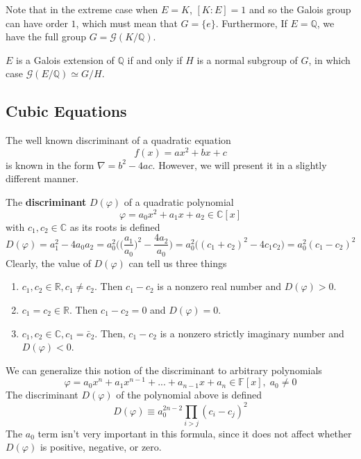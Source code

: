   Note that in the extreme case when $E = K$, $[K:E] = 1$ and so the Galois group can have order $1$, which must mean that $G = \{e\}$. Furthermore, If $E = \mathbb{Q}$, we have the full group $G = \mathcal{G}(K/\mathbb{Q})$. 

  \begin{corollary}
    $E$ is a Galois extension of $\mathbb{Q}$ if and only if $H$ is a normal subgroup of $G$, in which case $\mathcal{G}(E/\mathbb{Q}) \simeq G/H$. 
  \end{corollary}

\subsection{Cubic Equations}

  The well known discriminant of a quadratic equation 
  \begin{equation}
    f(x) = ax^2 + bx + c
  \end{equation}
  is known in the form $\nabla = b^2 - 4ac$. However, we will present it in a slightly different manner. 

  \begin{definition}
    The \textbf{discriminant} $D(\varphi)$ of a quadratic polynomial
    \begin{equation}
      \varphi = a_0 x^2 + a_1 x + a_2 \in \mathbb{C}[x]
    \end{equation}
    with $c_1, c_2 \in \mathbb{C}$ as its roots is defined
    \begin{equation}
      D(\varphi) = a_1^2 - 4 a_0 a_2 = a_0^2 \bigg( \Big(\frac{a_1}{a_0} \Big)^2 - \frac{4 a_2}{a_0} \bigg) = a_0^2 \big( (c_1 + c_2)^2 - 4 c_1 c_2 \big) = a_0^2 (c_1 - c_2)^2
    \end{equation}
    Clearly, the value of $D(\varphi)$ can tell us three things
    \begin{enumerate}
      \item $c_1, c_2 \in \mathbb{R}, c_1 \neq c_2$. Then $c_1 - c_2$ is a nonzero real number and $D(\varphi) > 0$. 
      \item $c_1 = c_2 \in \mathbb{R}$. Then $c_1 - c_2 = 0$ and $D(\varphi) = 0$. 
      \item $c_1, c_2 \in \mathbb{C}, c_1 = \bar{c}_2$. Then, $c_1 - c_2$ is a nonzero strictly imaginary number and $D(\varphi) < 0$. 
    \end{enumerate}
  \end{definition}

  \begin{definition}
    We can generalize this notion of the discriminant to arbitrary polynomials
    \begin{equation}
      \varphi = a_0 x^n + a_1 x^{n-1} + ... + a_{n-1} x + a_n \in \mathbb{F}[x], \; a_0 \neq 0
    \end{equation}
    The discriminant $D(\varphi)$ of the polynomial above is defined
    \begin{equation}
      D(\varphi) \equiv a_0^{2n-2} \prod_{i>j} (c_i - c_j)^2
    \end{equation}
    The $a_0$ term isn't very important in this formula, since it does not affect whether $D(\varphi)$ is positive, negative, or zero. 
  \end{definition}

